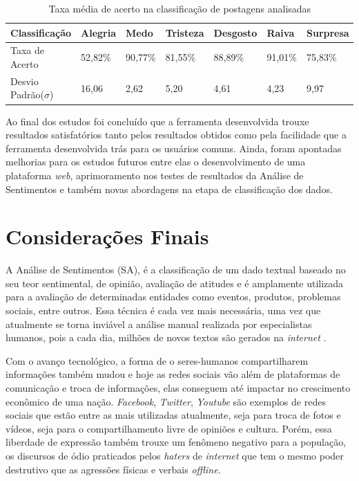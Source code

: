 \begin{table}[h!]
  \begin{center}
    \caption{Taxa média de acerto na classificação de postagens analisadas}
    \label{tab:taxaacerto}
    \begin{tabular}{lllllll} %
      \textbf{Classificação} & \textbf{Alegria} & \textbf{Medo} & \textbf{Tristeza} & \textbf{Desgosto} & \textbf{Raiva} & \textbf{Surpresa}\\
      \hline
      Taxa de Acerto&52,82\%&90,77\%&81,55\%&88,89\%&91,01\%&75,83\%\\
      Desvio Padrão($\sigma$)&16,06&2,62&5,20&4,61&4,23&9,97\\
      \hline
    \end{tabular}
  \end{center}
\end{table}

Ao final dos estudos foi concluído que a ferramenta desenvolvida trouxe resultados satisfatórios tanto pelos resultados obtidos como pela facilidade que a ferramenta desenvolvida trás para os usuários comuns. Ainda, foram apontadas melhorias para os estudos futuros entre elas o desenvolvimento de uma plataforma \textit{web}, aprimoramento nos testes de resultados da Análise de Sentimentos e também novas abordagens na etapa de classificação dos dados. 

\section{Considerações Finais}
A Análise de Sentimentos (SA), é a classificação de um dado textual baseado no seu teor sentimental, de opinião, avaliação de atitudes e é amplamente utilizada para a avaliação de determinadas entidades como eventos, produtos, problemas sociais, entre outros. Essa técnica é cada vez mais necessária, uma vez que atualmente se torna inviável a análise manual realizada por especialistas humanos, pois a cada dia, milhões de novos textos são gerados na \textit{internet} \cite{BAHRI2018669}.

Com o avanço tecnológico, a forma de o seres-humanos compartilharem informações também mudou e hoje as redes sociais vão além de plataformas de comunicação e troca de informações, elas conseguem até impactar no crescimento econômico de uma nação. \textit{Facebook}, \textit{Twitter}, \textit{Youtube} são exemplos de redes sociais que estão entre as mais utilizadas atualmente, seja para troca de fotos e vídeos, seja para o compartilhamento livre de opiniões e cultura. Porém, essa liberdade de expressão também trouxe um fenômeno negativo para a população, os discursos de ódio praticados pelos \textit{haters} de \textit{internet} que tem o mesmo poder destrutivo que as agressões físicas e verbais \textit{offline}. 

